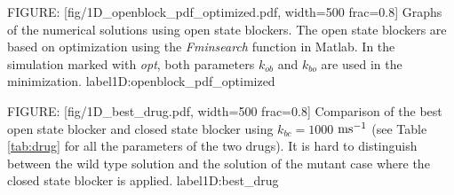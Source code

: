 FIGURE: [fig/1D_openblock_pdf_optimized.pdf, width=500 frac=0.8]  Graphs of the numerical solutions using open state blockers. The open state blockers are based on optimization using the 
{\it Fminsearch} function in Matlab.
In the simulation marked with {\it opt}, both parameters $k_{ob}$ and $k_{bo}$ are used in the minimization.
 label{1D:openblock_pdf_optimized}%



FIGURE: [fig/1D_best_drug.pdf, width=500 frac=0.8] Comparison of the best open state blocker and closed state blocker using $k_{bc}=1000$ $\rm{ms^{-1}}$ (see Table 
\ref{tab:drug} for all the parameters of the two drugs). It is hard to distinguish between the wild type solution and the solution of the mutant case where the closed state blocker is applied.   label{1D:best_drug}

